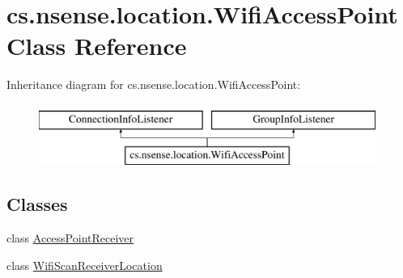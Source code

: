 \hypertarget{classcs_1_1nsense_1_1location_1_1_wifi_access_point}{\section{cs.\-nsense.\-location.\-Wifi\-Access\-Point Class Reference}
\label{classcs_1_1nsense_1_1location_1_1_wifi_access_point}
}
Inheritance diagram for cs.\-nsense.\-location.\-Wifi\-Access\-Point\-:\begin{figure}[H]
\begin{center}
\leavevmode
\includegraphics[height=2.000000cm]{classcs_1_1nsense_1_1location_1_1_wifi_access_point}
\end{center}
\end{figure}
\subsection*{Classes}
\begin{DoxyCompactItemize}
\item 
class \hyperlink{classcs_1_1nsense_1_1location_1_1_wifi_access_point_1_1_access_point_receiver}{Access\-Point\-Receiver}
\item 
class \hyperlink{classcs_1_1nsense_1_1location_1_1_wifi_access_point_1_1_wifi_scan_receiver_location}{Wifi\-Scan\-Receiver\-Location}
\end{DoxyCompactItemize}
